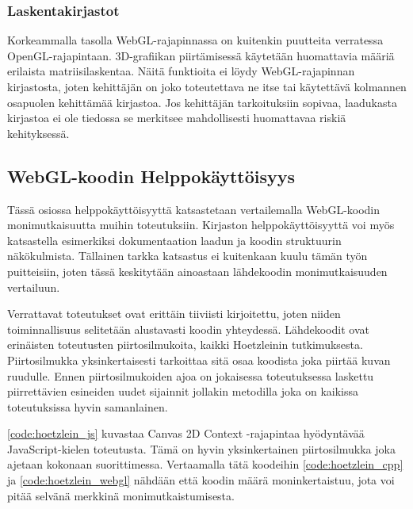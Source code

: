 \subsubsection{Laskentakirjastot}
Korkeammalla tasolla WebGL-rajapinnassa on kuitenkin puutteita verratessa OpenGL-rajapintaan. 3D-grafiikan piirtämisessä käytetään huomattavia määriä erilaista matriisilaskentaa. Näitä funktioita ei löydy WebGL-rajapinnan kirjastosta, joten kehittäjän on joko toteutettava ne itse tai käytettävä kolmannen osapuolen kehittämää kirjastoa. Jos kehittäjän tarkoituksiin sopivaa, laadukasta kirjastoa ei ole tiedossa se merkitsee mahdollisesti huomattavaa riskiä kehityksessä.


\subsection{WebGL-koodin Helppokäyttöisyys}
Tässä osiossa helppokäyttöisyyttä katsastetaan vertailemalla WebGL-koodin monimutkaisuutta muihin toteutuksiin. Kirjaston helppokäyttöisyyttä voi myös katsastella esimerkiksi dokumentaation laadun ja koodin struktuurin näkökulmista. Tällainen tarkka katsastus ei kuitenkaan kuulu tämän työn puitteisiin, joten tässä keskitytään ainoastaan lähdekoodin monimutkaisuuden vertailuun.

Verrattavat toteutukset ovat erittäin tiiviisti kirjoitettu, joten niiden toiminnallisuus selitetään alustavasti koodin yhteydessä. Lähdekoodit ovat erinäisten toteutusten piirtosilmukoita, kaikki Hoetzleinin\cite{hoetzlein} tutkimuksesta. Piirtosilmukka yksinkertaisesti tarkoittaa sitä osaa koodista joka piirtää kuvan ruudulle. Ennen piirtosilmukoiden ajoa on jokaisessa toteutuksessa laskettu piirrettävien esineiden uudet sijainnit jollakin metodilla joka on kaikissa toteutuksissa hyvin samanlainen\cite{hoetzlein}. 

\autoref{code:hoetzlein_js} kuvastaa Canvas 2D Context -rajapintaa hyödyntävää JavaScript-kielen toteutusta. Tämä on hyvin yksinkertainen piirtosilmukka joka ajetaan kokonaan suorittimessa. Vertaamalla tätä koodeihin \ref{code:hoetzlein_cpp} ja \ref{code:hoetzlein_webgl} nähdään että koodin määrä moninkertaistuu, jota voi pitää selvänä merkkinä monimutkaistumisesta. 



